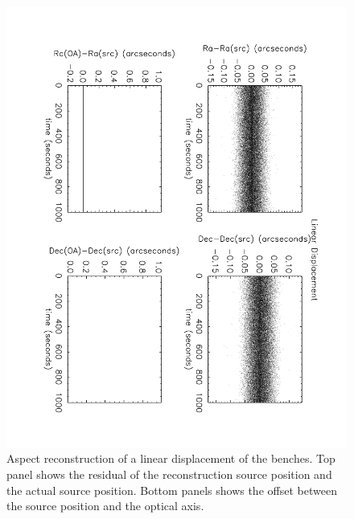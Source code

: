 \begin{figure}[htbp] %
   \centering
   \includegraphics[width=14cm,angle=180]{images/test2.pdf} 
   \caption{\footnotesize{Aspect reconstruction of a linear displacement of the benches. Top panel shows the residual of the reconstruction source position and the actual source position. Bottom panels shows the offset between the source position and the optical axis.}}
   \label{test2}
\end{figure}
